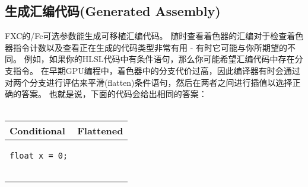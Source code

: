 \subsection{生成汇编代码(Generated Assembly)}
\begin{flushleft}
FXC的/Fc可选参数能生成可移植汇编代码。 随时查看着色器的汇编对于检查着色器指令计数以及查看正在生成的代码类型非常有用 - 有时它可能与你所期望的不同。 例如，如果你的HLSL代码中有条件语句，那么你可能希望汇编代码中存在分支指令。 在早期GPU编程中，着色器中的分支代价过高，因此编译器有时会通过对两个分支进行评估来平滑(flatten)条件语句，然后在两者之间进行插值以选择正确的答案。 也就是说，下面的代码会给出相同的答案：\\
~\\
\begin{tabular}{|p{20em}|p{20em}|} 
\hline
Conditional & Flattened\\ 
\hline
\begin{lstlisting}
float x = 0;


\end{lstlisting}
\end{tabular}
\end{flushleft}

